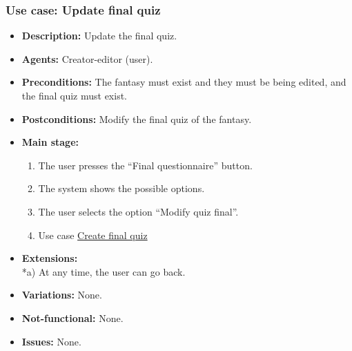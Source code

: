 \subsubsection{Use case: Update final quiz}
\begin{itemize}
	\item \textbf{Description:} Update the final quiz.
	\item \textbf{Agents:} Creator-editor (user).
	\item \textbf{Preconditions:} The fantasy must exist and they must be being edited, and the final quiz must exist.
	\item \textbf{Postconditions:} Modify the final quiz of the fantasy.
	\item \textbf{Main stage:}
	\begin{enumerate}
		\item The user presses the ``Final questionnaire'' button.
		\item The system shows the possible options.
		\item The user selects the option ``Modify quiz final''.
		\item Use case \hyperlink{crearquizfinal}{Create final quiz}
	\end{enumerate}
	\item \textbf{Extensions:} \\ *a) At any time, the user can go back.
	\item \textbf{Variations:} None.
	\item \textbf{Not-functional:} None.
	\item \textbf{Issues:} None.
\end{itemize}

